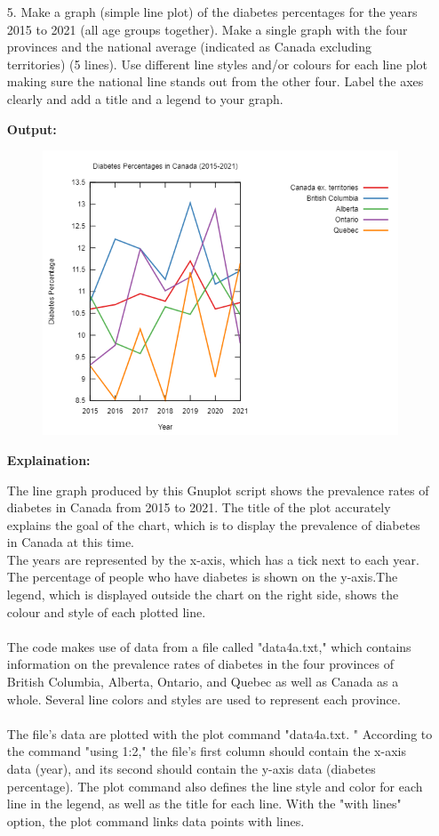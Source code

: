 


\begin{enumerate}
	\item[5.] {Make a graph (simple line plot) of the diabetes percentages for the years 2015 to 2021 (all age groups together). Make a single graph with the four provinces and the national average (indicated as Canada excluding territories) (5 lines). Use different line styles and/or colours for each line plot making sure the national line stands out from the other four. Label the axes clearly and add a title and a legend to your graph.}
	\item[\textbf{Output:}]
	\item[] {\begin{figure}[H]
		\includegraphics[width=12.75cm]{Q5.png}
		\end{figure}}
	\item[\textbf{Explaination:}]
	\item[] {The line graph produced by this Gnuplot script shows the prevalence rates of diabetes in Canada from 2015 to 2021. The title of the plot accurately explains the goal of the chart, which is to display the prevalence of diabetes in Canada at this time.\\ The years are represented by the x-axis, which has a tick next to each year. The percentage of people who have diabetes is shown on the y-axis.The legend, which is displayed outside the chart on the right side, shows the colour and style of each plotted line.\\ \\ The code makes use of data from a file called "data4a.txt," which contains information on the prevalence rates of diabetes in the four provinces of British Columbia, Alberta, Ontario, and Quebec as well as Canada as a whole. Several line colors and styles are used to represent each province.\\ \\The file's data are plotted with the plot command "data4a.txt. " According to the command "using 1:2," the file's first column should contain the x-axis data (year), and its second should contain the y-axis data (diabetes percentage). The plot command also defines the line style and color for each line in the legend, as well as the title for each line. With the "with lines" option, the plot command links data points with lines.}

\end{enumerate}
